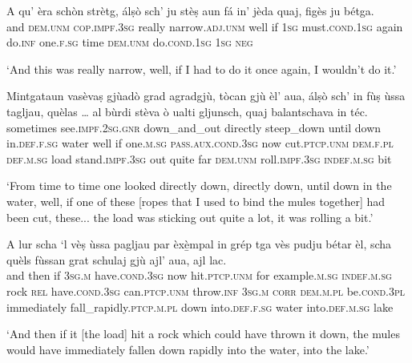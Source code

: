 \begin{linenumbers}
\gll  A qu' èra schòn strètg, álṣò sch’ ju stèṣ aun fá in’ jèda quaj, figès ju bétga.  \\
 and \textsc{dem.unm} \textsc{cop.impf.3sg} really narrow.\textsc{adj.unm} well if \textsc{1sg}  must.\textsc{cond.1sg} again do.\textsc{inf} one.\textsc{f.sg} time \textsc{dem.unm} do.\textsc{cond.1sg} \textsc{1sg} \textsc{neg} \\
\end{linenumbers}
\medskip
\glt `And this was really narrow, well, if I had to do it once again, I wouldn’t do it.'
\medskip

\begin{linenumbers}
\gll  Mintgataun vasèvaṣ gjùadò grad agradgjù, tòcan gjù èl’ aua, álṣò sch’ in fùṣ ùssa tagljau, quèlas … al bùrdi stèva ò ualti gljunsch, quaj balantschava in téc.  \\
sometimes see.\textsc{impf.2sg.gnr} down\_and\_out directly steep\_down until down in.\textsc{def.f.sg} water well if one.\textsc{m.sg} \textsc{pass.aux.cond.3sg} now cut.\textsc{ptcp.unm} \textsc{dem.f.pl} {}  \textsc{def.m.sg} load  stand.\textsc{impf.3sg} out quite far \textsc{dem.unm} roll.\textsc{impf.3sg}  \textsc{indef.m.sg} bit\\
\end{linenumbers}
\medskip
\glt `From time to time one looked directly down, directly down, until down in the water, well, if one of these [ropes that I used to bind the mules together] had been cut, these... the load was sticking out quite a lot, it was rolling a bit.'
\medskip

\begin{linenumbers}
\gll   A lur scha `l vèṣ ùssa pagljau par èxè̱mpal in grép tga vès pudju bétar èl, scha quèls fùssan grat schulaj gjù ajl’ aua, ajl lac.\\
and then if \textsc{3sg.m} have.\textsc{cond.3sg} now hit.\textsc{ptcp.unm} for example.\textsc{m.sg} \textsc{indef.m.sg} rock \textsc{rel} have.\textsc{cond.3sg} can.\textsc{ptcp.unm} throw.\textsc{inf} \textsc{3sg.m} \textsc{corr} \textsc{dem.m.pl} be.\textsc{cond.3pl} immediately fall\_rapidly.\textsc{ptcp.m.pl} down into.\textsc{def.f.sg} water into.\textsc{def.m.sg} lake\\
\end{linenumbers}
\medskip
\glt `And then if it [the load] hit a rock which could have thrown it down, the mules would have immediately fallen down rapidly into the water, into the lake.'
\medskip

